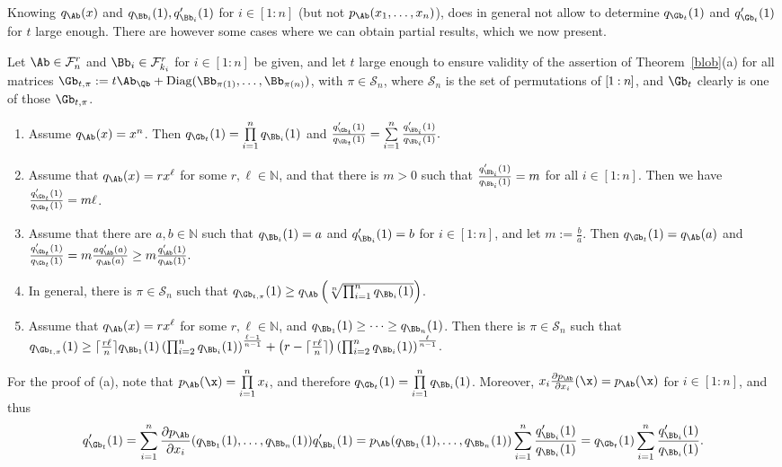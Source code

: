 \documentclass[moor]{informs3}              %
\def\irg#1#2{{ \in\! [{#1}\! : \! {#2}]}}
\def\rg#1#2{{ [\kern-.5pt{#1}\kern-.5pt : \kern-.5pt {#2}\kern-.5pt]}}
\begin{document}
Knowing $q_\Ab(x)$ and $q_{\Bb_i}(1), q'_{\Bb_i}(1)$ for $i\irg 1n$ (but not $p_\Ab(x_1,\ldots,x_n)$), does in general not allow to determine $q_{\Gb_t}(1)$ and $q'_{\Gb_t}(1)$ for
$t$ large enough. There are however some cases where we can obtain partial results, which we now present.
\begin{cly}\label{corasrss}
Let $\Ab\in\mathcal{F}^r_n$ and $\Bb_i\in\mathcal{F}^r_{k_i}$ for $i\irg 1n$ be given, and let $t$ large enough to ensure validity of the assertion of Theorem~\ref{blob}(a) for all matrices
$\Gb_{t,\pi}:=t\Ab_\Qb+\textup{Diag}(\Bb_{\pi(1)},\ldots,\Bb_{\pi(n)})$, with $\pi\in\mathcal{S}_n$, where $\mathcal{S}_n$ is the set of permutations of $\rg 1n$, and $\Gb_t$ clearly is one of those $\Gb_{t,\pi}$.
\begin{enumerate}
  \item [(a)] Assume $q_\Ab(x)=x^n$. Then $q_{\Gb_t}(1)=\prod\limits_{i=1}^nq_{\Bb_i}(1)$ and
  $\frac{q'_{\Gb_t}(1)}{q_{\Gb_t}(1)}=\sum\limits_{i=1}^n\frac{q'_{\Bb_i}(1)}{q_{\Bb_i}(1)}.$
  \item [(b)] Assume that $q_\Ab(x)=rx^\ell$ for some $r,\ell\in\mathbb{N}$, and that there is $m>0$ such that $\frac{q'_{\Bb_i}(1)}{q_{\Bb_i}(1)}=m$ for all $i\irg 1n$.
Then we have $\frac{q'_{\Gb_t}(1)}{q_{\Gb_t}(1)}=m\ell$.
  \item [(c)] Assume that there are $a,b\in\mathbb{N}$ such that $q_{\Bb_i}(1)=a$ and $q'_{\Bb_i}(1)=b$ for $i\irg 1n$, and let $m:=\frac ba$.
Then $q_{\Gb_t}(1)=q_\Ab(a)$ and $\frac{q'_{\Gb_t}(1)}{q_{\Gb_t}(1)}=m\frac{aq'_{\Ab}(a)}{q_{\Ab}(a)}\ge m\frac{q'_{\Ab}(1)}{q_{\Ab}(1)}.$
  \item [(d)]
  In general, there is $\pi\in\mathcal{S}_n$ such that
$q_{\Gb_{t,\pi}}(1)\ge q_\Ab\left(\sqrt[n]{\prod_{i=1}^nq_{\Bb_i}(1)}\right)$.
  \item [(e)] Assume that $q_\Ab(x)=rx^\ell$ for some $r,\ell\in\mathbb{N}$, and $q_{\Bb_1}(1)\ge\cdots\ge q_{\Bb_n}(1)$. Then there is $\pi\in\mathcal{S}_n$ such that
$q_{\Gb_{t,\pi}}(1)\ge \lceil \frac{r\ell}n\rceil q_{\Bb_1}(1)\left({\prod_{i=2}^nq_{\Bb_i}(1)}\right)^{\frac{\ell-1}{n-1}}+
\left(r-\lceil \frac{r\ell}n\rceil\right)\left({\prod_{i=2}^nq_{\Bb_i}(1)}\right)^{\frac{\ell}{n-1}}$.
\end{enumerate}
\end{cly}
\bep
For the proof of (a), note that $p_\Ab(\x)=\prod\limits_{i=1}^nx_i$, and therefore $q_{\Gb_t}(1)=\prod\limits_{i=1}^nq_{\Bb_i}(1)$.
Moreover, $x_i\frac{\partial p_\Ab}{\partial x_i}(\x)=p_\Ab(\x)$ for $i\irg 1n$, and thus
$$
q'_{\Gb_t}(1)=\sum_{i=1}^n\frac{\partial p_\Ab}{\partial x_i}(q_{\Bb_1}(1),\ldots,q_{\Bb_n}(1))q'_{\Bb_i}(1)=p_\Ab(q_{\Bb_1}(1),\ldots,q_{\Bb_n}(1))\sum_{i=1}^n\frac{q'_{\Bb_i}(1)}{q_{\Bb_i}(1)}
=q_{\Gb_t}(1)\sum_{i=1}^n\frac{q'_{\Bb_i}(1)}{q_{\Bb_i}(1)}.
$$
\end{document}
